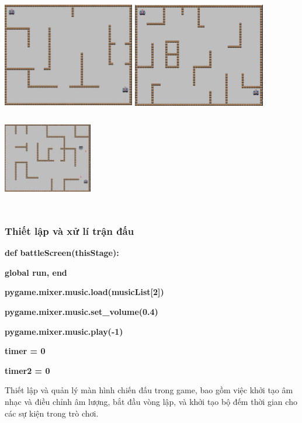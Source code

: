 \documentclass[a4paper]{article}
\begin{document}
\includegraphics[width=2.275in,height=1.79722in]{image52.png}
\includegraphics[width=2.27639in,height=1.79722in]{image25.png}
\includegraphics[width=1.53472in,height=1.78472in]{image53.png}

\subsubsection{Thiết lập và xử lí trận đấu}
\textbf{def battleScreen(thisStage):}

\textbf{global run, end}

\textbf{pygame.mixer.music.load(musicList{[}2{]})}

\textbf{pygame.mixer.music.set\_volume(0.4)}

\textbf{pygame.mixer.music.play(-1)}

\textbf{timer = 0}

\textbf{timer2 = 0}

Thiết lập và quản lý màn hình chiến đấu trong game, bao gồm việc khởi
tạo âm nhạc và điều chỉnh âm lượng, bắt đầu vòng lập, và khởi tạo bộ đếm
thời gian cho các sự kiện trong trò chơi.
 
\end{document}
